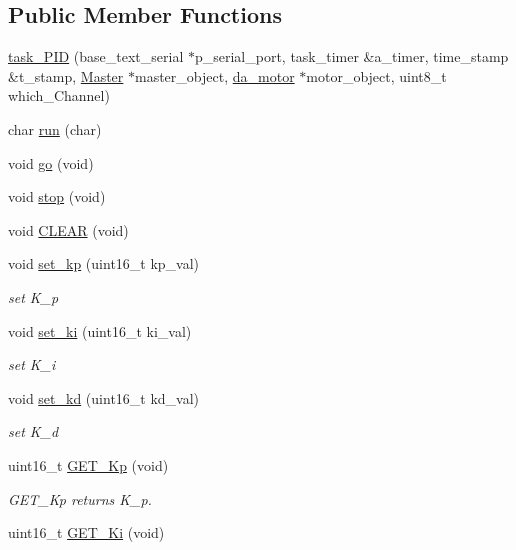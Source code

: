 \subsection*{Public Member Functions}
\begin{DoxyCompactItemize}
\item 
\hyperlink{classtask__PID_a2e6f07f6c2d77478c31098a329c0e145}{task\-\_\-\-P\-I\-D} (base\-\_\-text\-\_\-serial $\ast$p\-\_\-serial\-\_\-port, task\-\_\-timer \&a\-\_\-timer, time\-\_\-stamp \&t\-\_\-stamp, \hyperlink{classMaster}{Master} $\ast$master\-\_\-object, \hyperlink{classda__motor}{da\-\_\-motor} $\ast$motor\-\_\-object, uint8\-\_\-t which\-\_\-\-Channel)
\item 
char \hyperlink{classtask__PID_a6f05dcd8d4efe5ab56610e02ea814b7b}{run} (char)
\item 
void \hyperlink{classtask__PID_af5c32248046e469d4a7d84bf5edef147}{go} (void)
\item 
void \hyperlink{classtask__PID_af0a7b8ea266e97a883b58a8efc7812e4}{stop} (void)
\item 
void \hyperlink{classtask__PID_a39f37fa8c4514697bc6fe25fc6bd3498}{C\-L\-E\-A\-R} (void)
\item 
void \hyperlink{classtask__PID_a42c0117a576e25c264e2d62c6224ba6f}{set\-\_\-kp} (uint16\-\_\-t kp\-\_\-val)
\begin{DoxyCompactList}\small\item\em set K\-\_\-p \end{DoxyCompactList}\item 
void \hyperlink{classtask__PID_a6b61639ae796073f60e452a19a692e4e}{set\-\_\-ki} (uint16\-\_\-t ki\-\_\-val)
\begin{DoxyCompactList}\small\item\em set K\-\_\-i \end{DoxyCompactList}\item 
void \hyperlink{classtask__PID_ab086212c737d28bfa3af6f423eb4c54a}{set\-\_\-kd} (uint16\-\_\-t kd\-\_\-val)
\begin{DoxyCompactList}\small\item\em set K\-\_\-d \end{DoxyCompactList}\item 
\hypertarget{classtask__PID_ae4dbe31628ed6557e7703494006744e4}{uint16\-\_\-t \hyperlink{classtask__PID_ae4dbe31628ed6557e7703494006744e4}{G\-E\-T\-\_\-\-Kp} (void)}\label{classtask__PID_ae4dbe31628ed6557e7703494006744e4}

\begin{DoxyCompactList}\small\item\em G\-E\-T\-\_\-\-Kp returns K\-\_\-p. \end{DoxyCompactList}\item 
\hypertarget{classtask__PID_a3e065d324a3f296cf32297370a6026c4}{uint16\-\_\-t \hyperlink{classtask__PID_a3e065d324a3f296cf32297370a6026c4}{G\-E\-T\-\_\-\-Ki} (void)}\label{classtask__PID_a3e065d324a3f296cf32297370a6026c4}


\end{DoxyCompactItemize}
